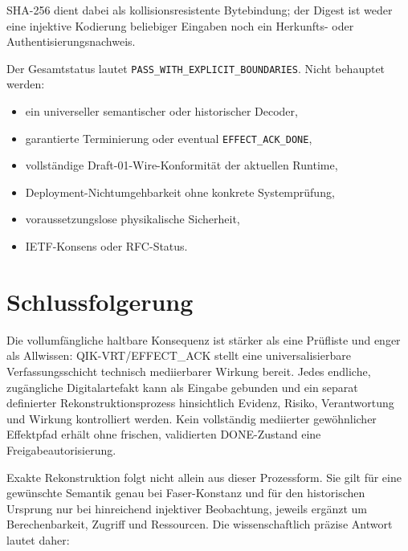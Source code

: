 \documentclass[11pt,a4paper]{article}
\newcommand{\DONE}{\texttt{EFFECT\_ACK\_DONE}}
\begin{document}
SHA-256 dient dabei als kollisionsresistente Bytebindung; der Digest ist weder
eine injektive Kodierung beliebiger Eingaben noch ein Herkunfts- oder
Authentisierungsnachweis.

Der Gesamtstatus lautet
\texttt{PASS\_WITH\_EXPLICIT\_BOUNDARIES}. Nicht behauptet werden:

\begin{itemize}
  \item ein universeller semantischer oder historischer Decoder,
  \item garantierte Terminierung oder eventual \DONE,
  \item vollständige Draft-01-Wire-Konformität der aktuellen Runtime,
  \item Deployment-Nichtumgehbarkeit ohne konkrete Systemprüfung,
  \item voraussetzungslose physikalische Sicherheit,
  \item IETF-Konsens oder RFC-Status.
\end{itemize}

\section{Schlussfolgerung}

Die vollumfängliche haltbare Konsequenz ist stärker als eine Prüfliste und
enger als Allwissen: QIK-VRT/EFFECT\_ACK stellt eine universalisierbare
Verfassungsschicht technisch mediierbarer Wirkung bereit. Jedes endliche,
zugängliche Digitalartefakt kann als Eingabe gebunden und ein separat
definierter Rekonstruktionsprozess hinsichtlich Evidenz, Risiko,
Verantwortung und Wirkung kontrolliert werden. Kein vollständig mediierter
gewöhnlicher Effektpfad erhält ohne frischen, validierten DONE-Zustand eine
Freigabeautorisierung.

Exakte Rekonstruktion folgt nicht allein aus dieser Prozessform. Sie gilt für
eine gewünschte Semantik genau bei Faser-Konstanz und für den historischen
Ursprung nur bei hinreichend injektiver Beobachtung, jeweils ergänzt um
Berechenbarkeit, Zugriff und Ressourcen. Die wissenschaftlich präzise Antwort
lautet daher:

\begin{center}
\end{center}
\end{document}
